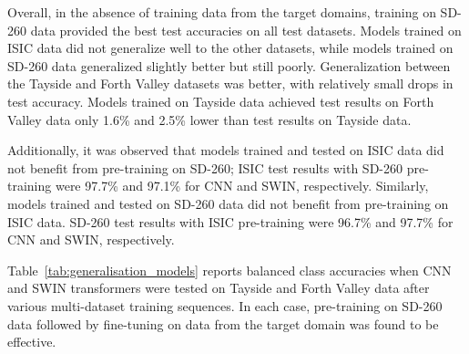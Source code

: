 Overall, in the absence of training data from the target domains, training on SD-260 data provided the best test accuracies on all test datasets. Models trained on ISIC data did not generalize well to the other datasets, while models trained on SD-260 data generalized slightly better but still poorly. Generalization between the Tayside and Forth Valley datasets was better, with relatively small drops in test accuracy. Models trained on Tayside data achieved test results on Forth Valley data only 1.6\% and 2.5\% lower than test results on Tayside data.

Additionally, it was observed that models trained and tested on ISIC data did not benefit from pre-training on SD-260; ISIC test results with SD-260 pre-training were 97.7\% and 97.1\% for CNN and SWIN, respectively. Similarly, models trained and tested on SD-260 data did not benefit from pre-training on ISIC data. SD-260 test results with ISIC pre-training were 96.7\% and 97.7\% for CNN and SWIN, respectively.

Table~\ref{tab:generalisation_models} reports balanced class accuracies when CNN and SWIN transformers were tested on Tayside and Forth Valley data after various multi-dataset training sequences. In each case, pre-training on SD-260 data followed by fine-tuning on data from the target domain was found to be effective.


